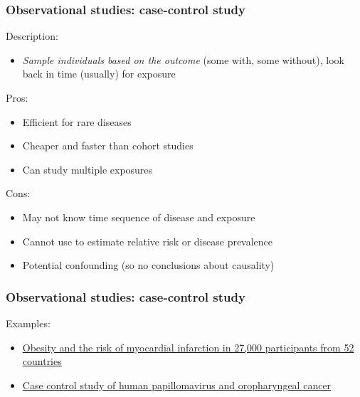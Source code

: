 \documentclass[12pt, 
hyperref={colorlinks=true, linkcolor=blue, urlcolor=cyan}]{beamer}
\begin{document}
\begin{frame}
\frametitle{Observational studies: case-control study}
Description: \vspace{-0.3cm}
\begin{itemize}
\item \textit{Sample individuals based on the outcome} (some with, some without), look back in time (usually) for exposure %
\end{itemize}

\pause
Pros:\vspace{-0.3cm}
\begin{itemize}
\item Efficient for rare diseases %
\item Cheaper and faster than cohort studies
\item Can study multiple exposures
\end{itemize}

\pause
Cons:\vspace{-0.3cm}
\begin{itemize}
\item May not know time sequence of disease and exposure
\item Cannot use to estimate relative risk or disease prevalence
\item Potential confounding (so no conclusions about causality)
\end{itemize}
\end{frame}

\begin{frame}
\frametitle{Observational studies: case-control study}
Examples:
\begin{itemize}
\item \href{https://www.sciencedirect.com/science/article/pii/S0140673605676635}{Obesity and the risk of myocardial infarction in 27,000 participants from 52 countries}
\item \href{http://www.nejm.org/doi/full/10.1056/NEJMoa065497\#t=article}{Case control study of human papillomavirus and oropharyngeal cancer}
\end{itemize}
\end{frame}
\end{document}
